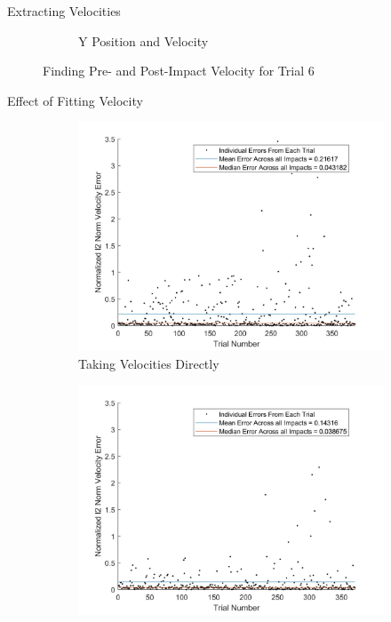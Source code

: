 \begin{frame}{Extracting Velocities}
\begin{figure}[h!]
\begin{subfigure}[b]{0.45\linewidth}
                \caption{Y Position and Velocity}
                \label{fig:yt6}
        \end{subfigure}
        \vspace{-1\baselineskip}
        \caption{Finding Pre- and Post-Impact Velocity for Trial 6}
    \end{figure}
\end{frame}

\begin{frame}{Effect of Fitting Velocity}
    \begin{figure}[h!]
        \centering
         \begin{subfigure}[b]{0.45\linewidth}
                \centering
                \includegraphics[scale=0.1]{figures/OriginalSquareData.jpg}
                \caption{Taking Velocities Directly}
                \label{fig:OrigSD}
        \end{subfigure}
        \quad
        \begin{subfigure}[b]{0.45\linewidth}
                \centering
                \includegraphics[scale=0.1]{figures/updatedSquareData.jpg}

\end{subfigure}
\end{figure}
\end{frame}

